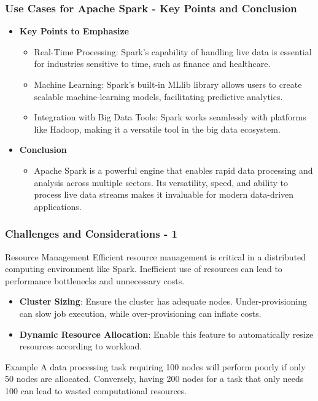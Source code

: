 \documentclass[aspectratio=169]{beamer}
\begin{document}
\begin{frame}[fragile]
    \frametitle{Use Cases for Apache Spark - Key Points and Conclusion}
    \begin{itemize}
        \item \textbf{Key Points to Emphasize}
        \begin{itemize}
            \item Real-Time Processing: Spark's capability of handling live data is essential for industries sensitive to time, such as finance and healthcare.
            \item Machine Learning: Spark's built-in MLlib library allows users to create scalable machine-learning models, facilitating predictive analytics.
            \item Integration with Big Data Tools: Spark works seamlessly with platforms like Hadoop, making it a versatile tool in the big data ecosystem.
        \end{itemize}
        
        \item \textbf{Conclusion}
        \begin{itemize}
            \item Apache Spark is a powerful engine that enables rapid data processing and analysis across multiple sectors. Its versatility, speed, and ability to process live data streams makes it invaluable for modern data-driven applications.
        \end{itemize}
    \end{itemize}
\end{frame}

\begin{frame}[fragile]
    \frametitle{Challenges and Considerations - 1}
    \begin{block}{Resource Management}
        Efficient resource management is critical in a distributed computing environment like Spark. Inefficient use of resources can lead to performance bottlenecks and unnecessary costs.
    \end{block}
    
    \begin{itemize}
        \item \textbf{Cluster Sizing}: Ensure the cluster has adequate nodes. Under-provisioning can slow job execution, while over-provisioning can inflate costs.
        \item \textbf{Dynamic Resource Allocation}: Enable this feature to automatically resize resources according to workload.
    \end{itemize}
    
    \begin{exampleblock}{Example}
        A data processing task requiring 100 nodes will perform poorly if only 50 nodes are allocated. Conversely, having 200 nodes for a task that only needs 100 can lead to wasted computational resources.
    \end{exampleblock}
\end{frame}
\end{document}
